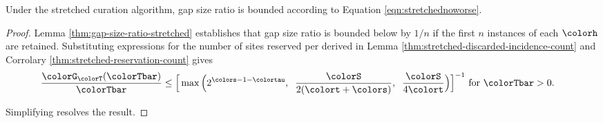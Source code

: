 \begin{theorem}
\label{thm:stretched-gap-size}
Under the stretched curation algorithm, gap size ratio is bounded according to Equation \ref{eqn:stretchednoworse}.
\end{theorem}
\begin{proof}

Lemma \ref{thm:gap-size-ratio-stretched} establishes that gap size ratio is bounded below by $1/n$ if the first $n$ instances of each \hv{} $\colorh$ are retained.
Substituting expressions for the number of sites reserved per \hv{} derived in Lemma \ref{thm:stretched-discarded-incidence-count} and Corrolary \ref{thm:stretched-reservation-count} gives
\begin{align*}
  \frac{\colorG_{\colorT}(\colorTbar)}{\colorTbar}
  &\leq
  \Big[
    \max\Big(
      2^{\colors - 1 - \colortau},\;\;
      \frac{\colorS}{2(\colort + \colors)},\;\;
      \frac{\colorS}{4\colort}
    \Big)
  \Big]^{-1}
\text{ for }
\colorTbar > 0.
\end{align*}

Simplifying resolves the result.

\end{proof}

